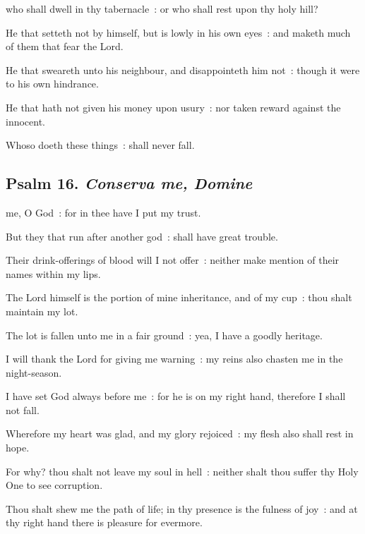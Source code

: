  who shall dwell in thy tabernacle~: or who shall rest upon thy holy hill?\par
{}
He that setteth not by himself, but is lowly in his own eyes~: and maketh much of them that fear the Lord.\par
{}He that sweareth unto his neighbour, and disappointeth him not~: though it were to his own hindrance.\par
{}He that hath not given his money upon usury~: nor taken reward against the innocent.\par
{}Whoso doeth these things~: shall never fall.\par

\vspace{-0.25\baselineskip}

\subsection{Psalm 16. \textit{Conserva me, Domine}}

 me, O God~: for in thee have I put my trust.\par
{}
But they that run after another god~: shall have great trouble.\par
{}Their drink-offerings of blood will I not offer~: neither make mention of their names within my lips.\par
{}The Lord himself is the portion of mine inheritance, and of my cup~: thou shalt maintain my lot.\par
{}The lot is fallen unto me in a fair ground~: yea, I have a goodly heritage.\par
{}I will thank the Lord for giving me warning~: my reins also chasten me in the night-season.\par
{}I have set God always before me~: for he is on my right hand, therefore I shall not fall.\par
{}Wherefore my heart was glad, and my glory rejoiced~: my flesh also shall rest in hope.\par
{}For why? thou shalt not leave my soul in hell~: neither shalt thou suffer thy Holy One to see corruption.\par
{}Thou shalt shew me the path of life; in thy presence is the fulness of joy~: and at thy right hand there is pleasure for evermore.\par

